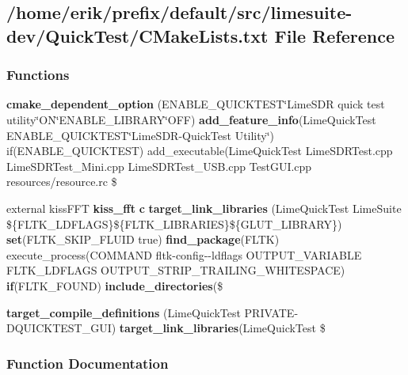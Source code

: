 \subsection{/home/erik/prefix/default/src/limesuite-\/dev/\+Quick\+Test/\+C\+Make\+Lists.txt File Reference}
\label{limesuite-dev_2QuickTest_2CMakeLists_8txt}
\subsubsection*{Functions}
\begin{DoxyCompactItemize}
\item 
{\bf cmake\+\_\+dependent\+\_\+option} (E\+N\+A\+B\+L\+E\+\_\+\+Q\+U\+I\+C\+K\+T\+E\+ST\char`\"{}Lime\+S\+DR quick test utility\char`\"{}ON\char`\"{}E\+N\+A\+B\+L\+E\+\_\+\+L\+I\+B\+R\+A\+RY\char`\"{}O\+FF) {\bf add\+\_\+feature\+\_\+info}(Lime\+Quick\+Test E\+N\+A\+B\+L\+E\+\_\+\+Q\+U\+I\+C\+K\+T\+E\+ST\char`\"{}Lime\+S\+DR-\/Quick\+Test Utility\char`\"{}) if(E\+N\+A\+B\+L\+E\+\_\+\+Q\+U\+I\+C\+K\+T\+E\+ST) add\+\_\+executable(Lime\+Quick\+Test Lime\+S\+D\+R\+Test.\+cpp Lime\+S\+D\+R\+Test\+\_\+\+Mini.\+cpp Lime\+S\+D\+R\+Test\+\_\+\+U\+S\+B.\+cpp Test\+G\+U\+I.\+cpp resources/resource.\+rc \$
\item 
external kiss\+F\+FT {\bf kiss\+\_\+fft} {\bf c} {\bf target\+\_\+link\+\_\+libraries} (Lime\+Quick\+Test Lime\+Suite \$\{F\+L\+T\+K\+\_\+\+L\+D\+F\+L\+A\+GS\}\$\{F\+L\+T\+K\+\_\+\+L\+I\+B\+R\+A\+R\+I\+ES\}\$\{G\+L\+U\+T\+\_\+\+L\+I\+B\+R\+A\+RY\}) {\bf set}(F\+L\+T\+K\+\_\+\+S\+K\+I\+P\+\_\+\+F\+L\+U\+ID true) {\bf find\+\_\+package}(F\+L\+TK) execute\+\_\+process(C\+O\+M\+M\+A\+ND fltk-\/config-\/-\/ldflags O\+U\+T\+P\+U\+T\+\_\+\+V\+A\+R\+I\+A\+B\+LE F\+L\+T\+K\+\_\+\+L\+D\+F\+L\+A\+GS O\+U\+T\+P\+U\+T\+\_\+\+S\+T\+R\+I\+P\+\_\+\+T\+R\+A\+I\+L\+I\+N\+G\+\_\+\+W\+H\+I\+T\+E\+S\+P\+A\+CE) {\bf if}(F\+L\+T\+K\+\_\+\+F\+O\+U\+ND) {\bf include\+\_\+directories}(\$
\item 
{\bf target\+\_\+compile\+\_\+definitions} (Lime\+Quick\+Test P\+R\+I\+V\+A\+TE-\/D\+Q\+U\+I\+C\+K\+T\+E\+S\+T\+\_\+\+G\+UI) {\bf target\+\_\+link\+\_\+libraries}(Lime\+Quick\+Test \$
\end{DoxyCompactItemize}


\subsubsection{Function Documentation}
